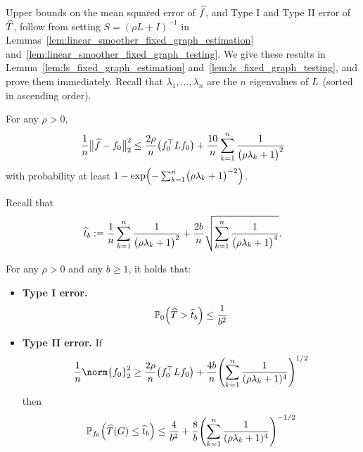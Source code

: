Upper bounds on the mean squared error of $\widehat{f}$, and Type I and Type II error of $\widehat{T}$, follow from setting $S = (\rho L + I)^{-1}$ in Lemmas~\ref{lem:linear_smoother_fixed_graph_estimation} and~\ref{lem:linear_smoother_fixed_graph_testing}. We give these results in Lemma~\ref{lem:ls_fixed_graph_estimation} and~\ref{lem:ls_fixed_graph_testing}, and prove them immediately. Recall that $\lambda_1,\ldots,\lambda_n$ are the $n$ eigenvalues of $L$ (sorted in ascending order).
\begin{lemma}
	\label{lem:ls_fixed_graph_estimation}
	For any $\rho > 0$,
	\begin{equation}
	\label{eqn:ls_fixed_graph_estimation_prob}
	\frac{1}{n}\bigl\|\widehat{f} - f_0\bigr\|_2^2 \leq \frac{2\rho}{n} \bigl(f_0^{\top} L f_0\bigr) + \frac{10}{n}\sum_{k = 1}^{n} \frac{1}{\bigl(\rho \lambda_{k} + 1\bigr)^2}
	\end{equation}
	with probability at least $1 - \exp\Bigl(-\sum_{k = 1}^{n}\bigl(\rho \lambda_k + 1\bigr)^{-2}\Bigr)$.
\end{lemma}
Recall that 
\begin{equation*}
\widehat{t}_b := \frac{1}{n}\sum_{k = 1}^{n} \frac{1}{\bigl(\rho \lambda_k + 1\bigr)^2} + \frac{2b}{n}\sqrt{\sum_{k = 1}^{n} \frac{1}{\bigl(\rho \lambda_k + 1\bigr)^4}}.
\end{equation*}
\begin{lemma}
	\label{lem:ls_fixed_graph_testing}
	For any $\rho > 0$ and any $b \geq 1$, it holds that:
	\begin{itemize}
		\item \textbf{Type I error.}
		\begin{equation}
		\label{eqn:ls_fixed_graph_testing_typeI}
		\mathbb{P}_0\Bigl(\widehat{T} > \widehat{t}_b\Bigr) \leq \frac{1}{b^2}
		\end{equation}
		\item \textbf{Type II error.} If
		\begin{equation}
		\label{eqn:ls_fixed_graph_testing_critical_radius}
		\frac{1}{n}\norm{f_0}_2^2 \geq \frac{2 \rho}{n} \bigl(f_0^{\top} \Lap f_0\bigr) + \frac{4b}{n} \Biggl(\sum_{k = 1}^{n} \frac{1}{(\rho\lambda_k + 1)^4} \Biggr)^{1/2}
		\end{equation}
		then
		\begin{equation}
		\label{eqn:ls_fixed_graph_testing_typeII}
		\mathbb{P}_{f_0}\Bigl(\widehat{T}(G) \leq \widehat{t}_b\Bigr) \leq \frac{4}{b^2} + \frac{8}{b} \Biggl(\sum_{k = 1}^{n} \frac{1}{(\rho\lambda_k + 1)^4} \Biggr)^{-1/2}
		\end{equation}
	\end{itemize}
\end{lemma}

